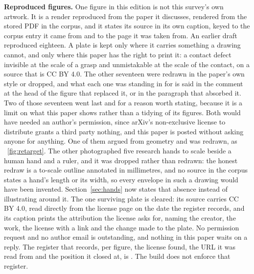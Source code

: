 \textbf{Reproduced figures.}
One figure in this edition is not this survey's own artwork. It is a render reproduced from the
paper it discusses, rendered from the stored PDF in the corpus, and it states its source in its own
caption, keyed to the corpus entry it came from and to the page it was taken from. An earlier draft
reproduced eighteen. A plate is kept only where it carries something a drawing cannot, and only
where this paper has the right to print it: a contact defect invisible at the scale of a grasp and
unmistakable at the scale of the contact, on a source that is CC BY 4.0. The other seventeen were
redrawn in the paper's own style or dropped, and what each one was standing in for is said in the
comment at the head of the figure that replaced it, or in the paragraph that absorbed it.
Two of those seventeen went last and for a reason worth stating, because it is a limit on what
this paper shows rather than a tidying of its figures. Both would have needed an author's
permission, since arXiv's non-exclusive license to distribute grants a third party nothing, and
this paper is posted without asking anyone for anything. One of them argued from geometry and was
redrawn, as \figurename~\ref{fig:retarget}. The other photographed five research hands to scale
beside a human hand and a ruler, and it was dropped rather than redrawn: the honest redraw is a
to-scale outline annotated in millimetres, and no source in the corpus states a hand's length or
its width, so every envelope in such a drawing would have been invented. Section~\ref{sec:hands}
now states that absence instead of illustrating around it.
The one surviving plate is cleared: its source carries CC BY 4.0, read directly from the license
page on the date the register records, and its caption prints the attribution the license asks for,
naming the creator, the work, the license with a link and the change made to the plate. No
permission request and no author email is outstanding, and nothing in this paper waits on a reply.
The register that records, per figure, the license found, the URL it was read from and the position
it closed at, is . The build does not enforce that register.



